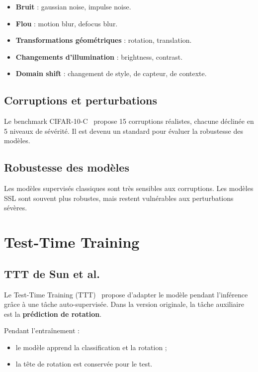 \documentclass[12pt,a4paper]{report}
\begin{document}
	\begin{itemize}
		\item \textbf{Bruit} : gaussian noise, impulse noise.
		\item \textbf{Flou} : motion blur, defocus blur.
		\item \textbf{Transformations géométriques} : rotation, translation.
		\item \textbf{Changements d’illumination} : brightness, contrast.
		\item \textbf{Domain shift} : changement de style, de capteur, de contexte.
	\end{itemize}
	
	\subsection{Corruptions et perturbations}
	
	Le benchmark CIFAR-10-C~\cite{Hendrycks2019} propose 15 corruptions réalistes, chacune déclinée en 5 niveaux de sévérité.  
	Il est devenu un standard pour évaluer la robustesse des modèles.
	
	\subsection{Robustesse des modèles}
	
	Les modèles supervisés classiques sont très sensibles aux corruptions.  
	Les modèles SSL sont souvent plus robustes, mais restent vulnérables aux perturbations sévères.
	
	\section{Test-Time Training}
	
	\subsection{TTT de Sun et al.}
	
	Le Test-Time Training (TTT)~\cite{Sun2020} propose d’adapter le modèle pendant l’inférence grâce à une tâche auto-supervisée.  
	Dans la version originale, la tâche auxiliaire est la \textbf{prédiction de rotation}.
	
	Pendant l’entraînement :
	\begin{itemize}
		\item le modèle apprend la classification et la rotation ;
		\item la tête de rotation est conservée pour le test.
	\end{itemize}
	
\end{document}
